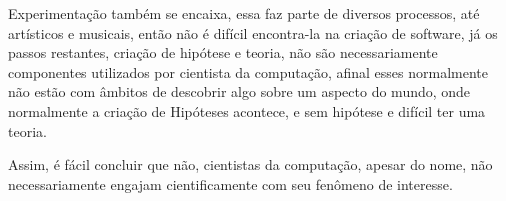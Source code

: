 Experimentação também se encaixa, essa faz parte de diversos processos, até artísticos e musicais, então não é difícil encontra-la na criação de software, já os passos restantes, criação de hipótese e teoria, não são necessariamente componentes utilizados por cientista da computação, afinal esses normalmente não estão com âmbitos de descobrir algo sobre um aspecto do mundo, onde normalmente a criação de Hipóteses acontece, e sem hipótese e difícil ter uma teoria.

Assim, é fácil concluir que não, cientistas da computação, apesar do nome, não necessariamente engajam cientificamente com seu fenômeno de interesse.